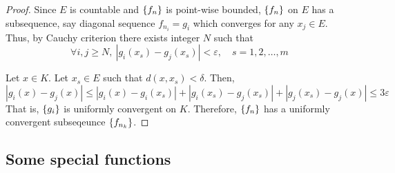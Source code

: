 \begin{proof}
	Since $E$ is countable and $\left\{f_n\right\}$ is point-wise bounded, $\left\{f_n\right\}$ on $E$ has a subsequence, say diagonal sequence $f_{n_i} = g_i$ which converges for any $x_j \in E$.
	Thus, by Cauchy criterion there exists integer $N$ such that 
	\[ \forall i,j \ge N,\ |g_i(x_s) - g_j(x_s)| < \varepsilon,\quad s = 1,2,\dots,m \]

	Let $x \in K$.
	Let $x_s \in E$ such that $d(x,x_s) < \delta$.
	Then,
	\[ |g_i(x) - g_j(x)| \le |g_i(x)-g_i(x_s)| + |g_i(x_s) - g_j(x_s)| + |g_j(x_s) - g_j(x)| \le 3\varepsilon \]
	That is, $\left\{g_i\right\}$ is uniformly convergent on $K$.
	Therefore, $\left\{f_n\right\}$ has a uniformly convergent subseqeunce $\left\{f_{n_k}\right\}$.
\end{proof}

\subsection{Some special functions}


